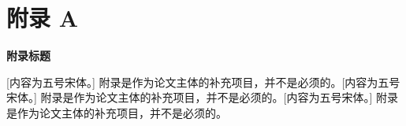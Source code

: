 

 \setlength{\baselineskip}{16pt}
\chapter{附录 A}


\begin{center}
\textbf{附录标题}
\end{center}



\indent
{}
[内容为五号宋体。] 附录是作为论文主体的补充项目，并不是必须的。[内容为五号宋体。] 附录是作为论文主体的补充项目，并不是必须的。[内容为五号宋体。] 附录是作为论文主体的补充项目，并不是必须的。
